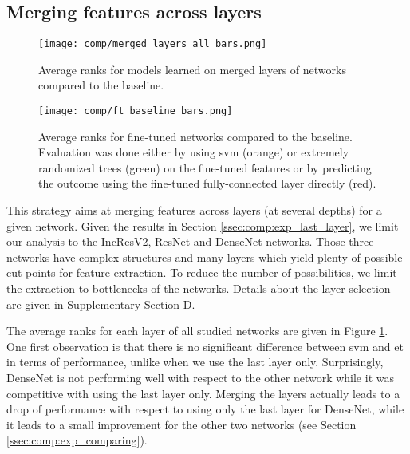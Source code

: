 \subsection{Merging features across layers}
\label{ssec:comp:exp_merged_layers}

\begin{figure}
     \center 
     \texttt{[image: comp/merged\_layers\_all\_bars.png]}
     \caption{Average ranks for models learned on merged layers of networks compared to the baseline.}
     \label{fig:comp:res_avg_ranks_merged_layers}
 \end{figure}
 

 
  \begin{figure}
     \center 
     \texttt{[image: comp/ft\_baseline\_bars.png]}
     \caption{Average ranks for fine-tuned networks compared to the baseline. Evaluation was done either by using \acrshort{svm} (orange) or extremely randomized trees (green) on the fine-tuned features or by predicting the outcome using the fine-tuned fully-connected layer directly (red).}
     \label{fig:comp:res_avg_ranks_ft}
 \end{figure}

This strategy aims at merging features across layers (at several depths) for a given network. Given the results in Section \ref{ssec:comp:exp_last_layer}, we limit our analysis to the IncResV2, ResNet and DenseNet networks. Those three networks have complex structures and many layers which yield plenty of possible cut points for feature extraction. To reduce the number of possibilities, we limit the extraction to bottlenecks of the networks. Details about the layer selection are given in Supplementary Section D. 

The average ranks for each layer of all studied networks are given in Figure \ref{fig:comp:res_avg_ranks_merged_layers}. One first observation is that there is no significant difference between \acrshort{svm} and \acrshort{et} in terms of performance, unlike when we use the last layer only. Surprisingly, DenseNet is not performing well with respect to the other network while it was competitive with using the last layer only. Merging the layers actually leads to a drop of performance with respect to using only the last layer for DenseNet, while it leads to a small improvement for the other two networks (see Section \ref{ssec:comp:exp_comparing}).

